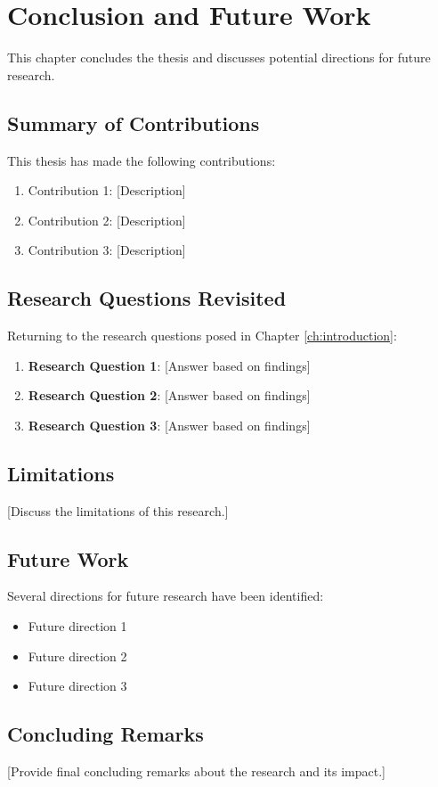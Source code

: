 \chapter{Conclusion and Future Work}
\label{ch:conclusion}

This chapter concludes the thesis and discusses potential directions for future research.

\section{Summary of Contributions}
\label{sec:contributions}

This thesis has made the following contributions:

\begin{enumerate}
    \item Contribution 1: [Description]
    \item Contribution 2: [Description]
    \item Contribution 3: [Description]
\end{enumerate}

\section{Research Questions Revisited}
\label{sec:rq-revisited}

Returning to the research questions posed in Chapter \ref{ch:introduction}:

\begin{enumerate}
    \item \textbf{Research Question 1}: [Answer based on findings]
    \item \textbf{Research Question 2}: [Answer based on findings]
    \item \textbf{Research Question 3}: [Answer based on findings]
\end{enumerate}

\section{Limitations}
\label{sec:limitations}

[Discuss the limitations of this research.]

\section{Future Work}
\label{sec:future-work}

Several directions for future research have been identified:

\begin{itemize}
    \item Future direction 1
    \item Future direction 2
    \item Future direction 3
\end{itemize}

\section{Concluding Remarks}
\label{sec:concluding-remarks}

[Provide final concluding remarks about the research and its impact.]
